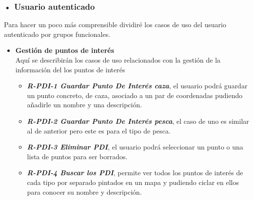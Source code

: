 \subsubsection{• Usuario  autenticado}
Para hacer un poco más comprensible dividiré los casos de uso del usuario autenticado por grupos funcionales.
\begin{itemize}
\item \textbf{Gestión de puntos de interés}\\
Aquí se describirán  los casos de uso relacionados con la gestión  de la  información del  los puntos de interés
\begin{itemize}
\item\textbf{\textit{ R-PDI-1 Guardar Punto De Interés caza}}, el usuario podrá guardar un punto concreto, de caza, asociado a un par de coordenadas pudiendo añadirle un nombre y una descripción.
\item\textit{ \textbf{R-PDI-2 Guardar Punto De Interés pesca}}, el caso de uno es similar al de anterior pero este es para el tipo de pesca.
\item \textbf{\textit{R-PDI-3 Eliminar PDI}}, el usuario podrá seleccionar un punto o una lista de puntos para ser borrados.
\item \textbf{\textit{R-PDI-4 Buscar los PDI}}, permite ver todos los puntos de interés de cada tipo por separado pintados en un mapa y pudiendo ciclar en ellos para conocer su nombre y descripción.
\end{itemize} 


\end{itemize}
